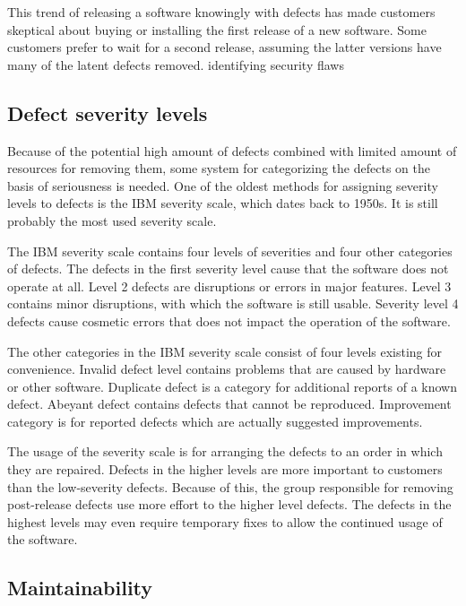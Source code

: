 This trend of releasing a software knowingly with defects has made customers skeptical about buying or installing the first release of a new software. Some customers prefer to wait for a second release, assuming the latter versions have many of the latent defects removed.
identifying security flaws


\subsection{Defect severity levels}

Because of the potential high amount of defects combined with limited amount of resources for removing them, some system for categorizing the defects on the basis of seriousness is needed. One of the oldest methods for assigning severity levels to defects is the IBM severity scale, which dates back to 1950s. It is still probably the most used severity scale.

The IBM severity scale contains four levels of severities and four other categories of defects. The defects in the first severity level cause that the software does not operate at all. Level 2 defects are disruptions or errors in major features. Level 3 contains minor disruptions, with which the software is still usable. Severity level 4 defects cause cosmetic errors that does not impact the operation of the software.

The other categories in the IBM severity scale consist of four levels existing for convenience. Invalid defect level contains problems that are caused by hardware or other software. Duplicate defect is a category for additional reports of a known defect. Abeyant defect contains defects that cannot be reproduced. Improvement category is for reported defects which are actually suggested improvements.

The usage of the severity scale is for arranging the defects to an order in which they are repaired. Defects in the higher levels are more important to customers than the low-severity defects. Because of this, the group responsible for removing post-release defects use more effort to the higher level defects. The defects in the highest levels may even require temporary fixes to allow the continued usage of the software.


\subsection{Maintainability}


